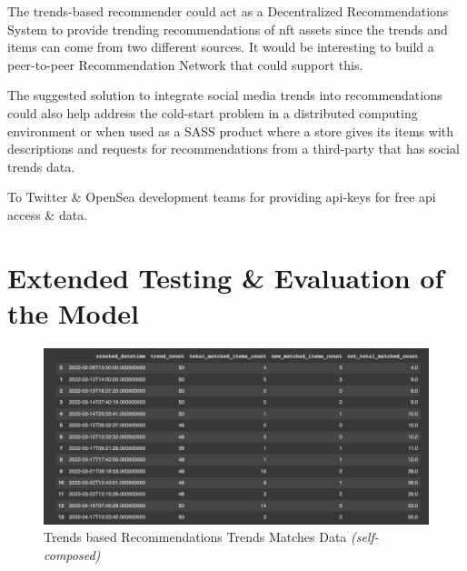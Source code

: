 \documentclass[manuscript,natbib=false, anonymous]{acmart}
\begin{document}
The trends-based recommender could act as a Decentralized Recommendations System to provide trending recommendations of \gls{nft} assets since the trends and items can come from two different sources. It would be interesting to build a peer-to-peer Recommendation Network that could support this.

The suggested solution to integrate social media trends into recommendations could also help address the cold-start problem in a distributed computing environment or when used as a SASS product where a store gives its items with descriptions and requests for recommendations from a third-party that has social trends data.

\begin{acks}
To Twitter \& OpenSea development teams for providing \gls{api}-keys for free \gls{api} access \& data.
\end{acks}

% 
% 
\printbibliography


\appendix

\section{Extended Testing \& Evaluation of the Model}
\label{appendix:extended-testing-eval}

\begin{figure}[h]
\centering
\includegraphics[width=\linewidth]{images/trend-match-count-data.png}
\caption{Trends based Recommendations Trends Matches Data \textit{(self-composed)}}
\label{fig:trends-recsys-trends-matches-data}
\end{figure}
\end{document}
